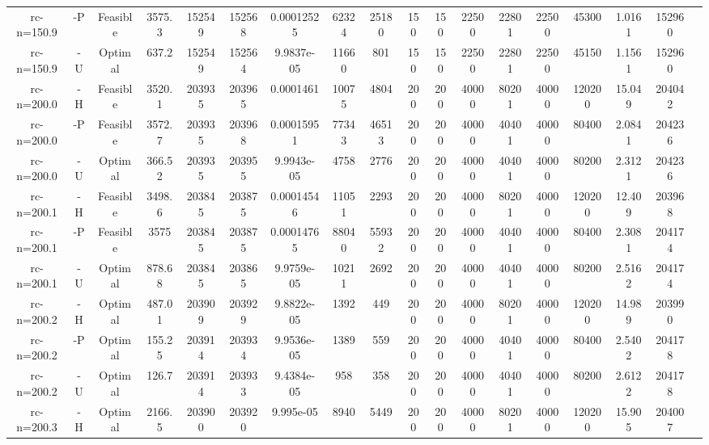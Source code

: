 \documentclass[landscape, a4paper]{article}
\begin{document}
\begin{center}
\begin{tabular}{@{}cccccccccccccccccc@{}}
rc-n=150.9 & -P & Feasible & 3575.3 & 152549 & 152568 & 0.00012525 & 62324 & 25180 & 150 & 150 & 22500 & 22801 & 22500 & 45300 & 1.0161 & 152960 & \\
rc-n=150.9 & -U & Optimal & 637.2 & 152549 & 152564 & 9.9837e-05 & 11660 & 801 & 150 & 150 & 22500 & 22801 & 22500 & 45150 & 1.1561 & 152960 & \\
rc-n=200.0 & -H & Feasible & 3520.1 & 203935 & 203965 & 0.0001461 & 10075 & 4804 & 200 & 200 & 40000 & 80201 & 40000 & 120200 & 15.049 & 204042 & \\
rc-n=200.0 & -P & Feasible & 3572.7 & 203935 & 203968 & 0.00015951 & 77343 & 46513 & 200 & 200 & 40000 & 40401 & 40000 & 80400 & 2.0841 & 204236 & \\
rc-n=200.0 & -U & Optimal & 366.52 & 203935 & 203955 & 9.9943e-05 & 4758 & 2776 & 200 & 200 & 40000 & 40401 & 40000 & 80200 & 2.3121 & 204236 & \\
rc-n=200.1 & -H & Feasible & 3498.6 & 203845 & 203875 & 0.00014546 & 11051 & 2293 & 200 & 200 & 40000 & 80201 & 40000 & 120200 & 12.409 & 203968 & \\
rc-n=200.1 & -P & Feasible & 3575 & 203845 & 203875 & 0.00014765 & 88040 & 55932 & 200 & 200 & 40000 & 40401 & 40000 & 80400 & 2.3081 & 204174 & \\
rc-n=200.1 & -U & Optimal & 878.68 & 203845 & 203865 & 9.9759e-05 & 10211 & 2692 & 200 & 200 & 40000 & 40401 & 40000 & 80200 & 2.5162 & 204174 & \\
rc-n=200.2 & -H & Optimal & 487.01 & 203909 & 203929 & 9.8822e-05 & 1392 & 449 & 200 & 200 & 40000 & 80201 & 40000 & 120200 & 14.989 & 203990 & \\
rc-n=200.2 & -P & Optimal & 155.25 & 203914 & 203934 & 9.9536e-05 & 1389 & 559 & 200 & 200 & 40000 & 40401 & 40000 & 80400 & 2.5402 & 204178 & \\
rc-n=200.2 & -U & Optimal & 126.7 & 203914 & 203933 & 9.4384e-05 & 958 & 358 & 200 & 200 & 40000 & 40401 & 40000 & 80200 & 2.6122 & 204178 & \\
rc-n=200.3 & -H & Optimal & 2166.5 & 203900 & 203920 & 9.995e-05 & 8940 & 5449 & 200 & 200 & 40000 & 80201 & 40000 & 120200 & 15.905 & 204007 & \\
\end{tabular}
\end{center}
\end{document}

